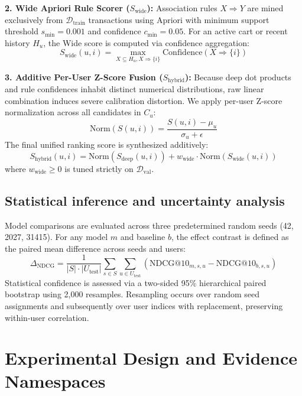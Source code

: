 \documentclass[10pt,a4paper]{article}
\begin{document}
\textbf{2. Wide Apriori Rule Scorer ($S_{\mathrm{wide}}$):} Association rules $X \Rightarrow Y$ are mined exclusively from $\mathcal{D}_{\mathrm{train}}$ transactions using Apriori with minimum support threshold $s_{\min} = 0.001$ and confidence $c_{\min} = 0.05$. For an active cart or recent history $H_u$, the Wide score is computed via confidence aggregation:
\begin{equation}
    S_{\mathrm{wide}}(u, i) = \max_{X \subseteq H_u, X \Rightarrow \{i\}} \mathrm{Confidence}(X \Rightarrow \{i\})
\end{equation}

\textbf{3. Additive Per-User Z-Score Fusion ($S_{\mathrm{hybrid}}$):} Because deep dot products and rule confidences inhabit distinct numerical distributions, raw linear combination induces severe calibration distortion. We apply per-user Z-score normalization across all candidates in $C_u$:
\begin{equation}
    \mathrm{Norm}(S(u, i)) = \frac{S(u, i) - \mu_u}{\sigma_u + \epsilon}
\end{equation}
The final unified ranking score is synthesized additively:
\begin{equation}
    S_{\mathrm{hybrid}}(u, i) = \mathrm{Norm}(S_{\mathrm{deep}}(u, i)) + w_{\mathrm{wide}} \cdot \mathrm{Norm}(S_{\mathrm{wide}}(u, i))
\end{equation}
where $w_{\mathrm{wide}} \ge 0$ is tuned strictly on $\mathcal{D}_{\mathrm{val}}$.

\subsection{Statistical inference and uncertainty analysis}

Model comparisons are evaluated across three predetermined random seeds (42, 2027, 31415). For any model $m$ and baseline $b$, the effect contrast is defined as the paired mean difference across seeds and users:
\begin{equation}
    \Delta_{\mathrm{NDCG}} = \frac{1}{|S| \cdot |U_{\mathrm{test}}|} \sum_{s \in S} \sum_{u \in U_{\mathrm{test}}} \left( \mathrm{NDCG@10}_{m,s,u} - \mathrm{NDCG@10}_{b,s,u} \right)
\end{equation}
Statistical confidence is assessed via a two-sided 95\% hierarchical paired bootstrap using 2,000 resamples. Resampling occurs over random seed assignments and subsequently over user indices with replacement, preserving within-user correlation.

\section{Experimental Design and Evidence Namespaces}
\end{document}
